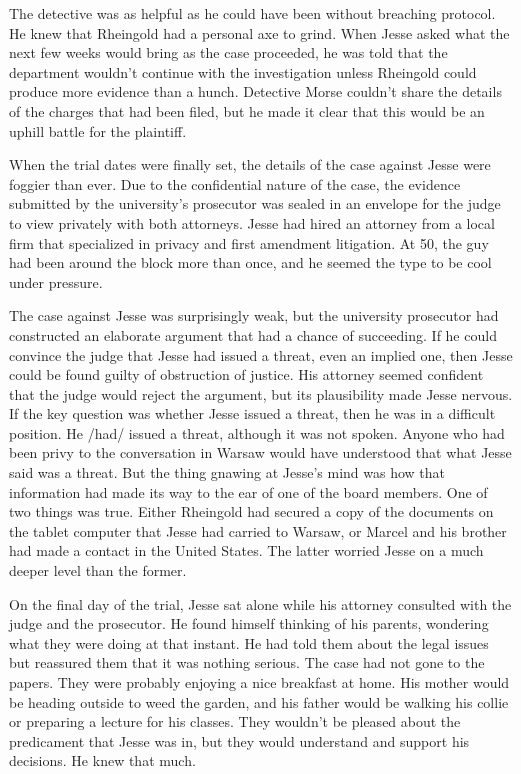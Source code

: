 The detective was as helpful as he could have been without breaching protocol.  He knew that Rheingold had a personal axe to grind.  When Jesse asked what the next few weeks would bring as the case proceeded, he was told that the department wouldn't continue with the investigation unless Rheingold could produce more evidence than a hunch.  Detective Morse couldn't share the details of the charges that had been filed, but he made it clear that this would be an uphill battle for the plaintiff.


When the trial dates were finally set, the details of the case against Jesse were foggier than ever.  Due to the confidential nature of the case, the evidence submitted by the university's prosecutor was sealed in an envelope for the judge to view privately with both attorneys.  Jesse had hired an attorney from a local firm that specialized in privacy and first amendment litigation.  At 50, the guy had been around the block more than once, and he seemed the type to be cool under pressure.

The case against Jesse was surprisingly weak, but the university prosecutor had constructed an elaborate argument that had a chance of succeeding.  If he could convince the judge that Jesse had issued a threat, even an implied one, then Jesse could be found guilty of obstruction of justice.  His attorney seemed confident that the judge would reject the argument, but its plausibility made Jesse nervous.  If the key question was whether Jesse issued a threat, then he was in a difficult position.  He /had/ issued a threat, although it was not spoken.  Anyone who had been privy to the conversation in Warsaw would have understood that what Jesse said was a threat.  But the thing gnawing at Jesse's mind was how that information had made its way to the ear of one of the board members.  One of two things was true.  Either Rheingold had secured a copy of the documents on the tablet computer that Jesse had carried to Warsaw, or Marcel and his brother had made a contact in the United States.  The latter worried Jesse on a much deeper level than the former.


On the final day of the trial, Jesse sat alone while his attorney consulted with the judge and the prosecutor.  He found himself thinking of his parents, wondering what they were doing at that instant.  He had told them about the legal issues but reassured them that it was nothing serious.  The case had not gone to the papers.  They were probably enjoying a nice breakfast at home.  His mother would be heading outside to weed the garden, and his father would be walking his collie or preparing a lecture for his classes.  They wouldn't be pleased about the predicament that Jesse was in, but they would understand and support his decisions.  He knew that much.

